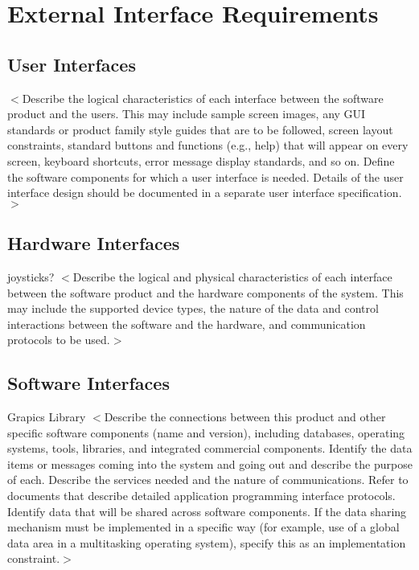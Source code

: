 \documentclass{scrreprt}
\begin{document}


\chapter{External Interface Requirements}

\section{User Interfaces}
$<$Describe the logical characteristics of each interface between the software 
product and the users. This may include sample screen images, any GUI standards 
or product family style guides that are to be followed, screen layout 
constraints, standard buttons and functions (e.g., help) that will appear on 
every screen, keyboard shortcuts, error message display standards, and so on.  
Define the software components for which a user interface is needed. Details of 
the user interface design should be documented in a separate user interface 
specification.$>$

\section{Hardware Interfaces}
joysticks?
$<$Describe the logical and physical characteristics of each interface between 
the software product and the hardware components of the system. This may include 
the supported device types, the nature of the data and control interactions 
between the software and the hardware, and communication protocols to be 
used.$>$

\section{Software Interfaces}
Grapics Library
$<$Describe the connections between this product and other specific software 
components (name and version), including databases, operating systems, tools, 
libraries, and integrated commercial components. Identify the data items or 
messages coming into the system and going out and describe the purpose of each.  
Describe the services needed and the nature of communications. Refer to 
documents that describe detailed application programming interface protocols.  
Identify data that will be shared across software components. If the data 
sharing mechanism must be implemented in a specific way (for example, use of a 
global data area in a multitasking operating system), specify this as an 
implementation constraint.$>$
\end{document}
